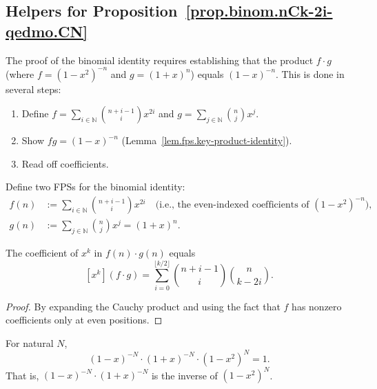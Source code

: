 \subsection{Helpers for Proposition~\ref{prop.binom.nCk-2i-qedmo.CN}}

The proof of the binomial identity requires establishing that the product
$f\cdot g$ (where $f = (1-x^2)^{-n}$ and $g = (1+x)^n$) equals $(1-x)^{-n}$.
This is done in several steps:

\begin{enumerate}
\item Define $f = \sum_{i\in\mathbb{N}} \binom{n+i-1}{i} x^{2i}$ and
      $g = \sum_{j\in\mathbb{N}} \binom{n}{j} x^j$.
\item Show $fg = (1-x)^{-n}$
      (Lemma~\ref{lem.fps.key-product-identity}).
\item Read off coefficients.
\end{enumerate}

\begin{definition}
\label{def.fps.f-series-g-series}
\leanhelper
\leanok
Define two FPSs for the binomial identity:
\begin{align*}
f(n) &:= \sum_{i\in\mathbb{N}} \binom{n+i-1}{i} x^{2i}
\quad\text{(i.e., the even-indexed coefficients of $(1-x^2)^{-n}$)}, \\
g(n) &:= \sum_{j\in\mathbb{N}} \binom{n}{j} x^j = (1+x)^n.
\end{align*}
\end{definition}

\begin{lemma}
\label{lem.fps.coeff-f-mul-g}
\leanhelper
\leanok
The coefficient of $x^k$ in $f(n)\cdot g(n)$ equals
\[
[x^k](f\cdot g) = \sum_{i=0}^{\lfloor k/2\rfloor} \binom{n+i-1}{i}\binom{n}{k-2i}.
\]
\end{lemma}

\begin{proof}
By expanding the Cauchy product and using the fact that $f$ has
nonzero coefficients only at even positions.
\end{proof}

\begin{lemma}
\label{lem.fps.invOneSubPow-mul-rescale-inv}
\leanhelper
\leanok
For natural $N$,
\[
(1-x)^{-N}\cdot (1+x)^{-N}\cdot (1-x^2)^N = 1.
\]
That is, $(1-x)^{-N}\cdot(1+x)^{-N}$ is the inverse of $(1-x^2)^N$.
\end{lemma}

